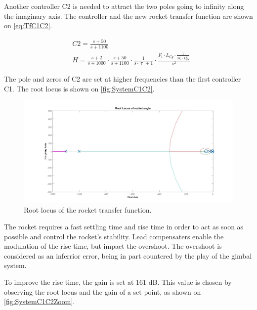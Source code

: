 Another controller C2 is needed to attract the two poles going to infinity along the imaginary axis. The controller and the new rocket transfer function are shown on \autoref{eq:TfC1C2}.

\begin{subequations}
	\begin{flalign}
		& C2 = \frac{s + 50}{s + 1100}	\\
		& H = \frac{s + 2}{s + 1000} \cdot \frac{s + 50}{s + 1100} \cdot \frac{1}{s \cdot \uptau + 1} \cdot \frac{F_t \cdot L_{Cg} \cdot \frac{1}{M_r \cdot L_{Es}^2}}{s^2}
		\label{eq:TfC1C2}
	\end{flalign}
\end{subequations}

The pole and zeros of C2 are set at higher frequencies than the first controller C1. The root locus is shown on \autoref{fig:SystemC1C2}.

\begin{figure}[htbp]
	\centering
	
		\includegraphics[width=\textwidth]{figures/Rocket/design/tf_with_controller_1_vf2}
		\caption{Root locus of the rocket transfer function.}
		\label{fig:SystemC1C2}
		
\end{figure}

The rocket requires a fast settling time and rise time in order to act as soon as possible and control the rocket's stability. Lead compensaters enable the modulation of the rise time, but impact the overshoot. The overshoot is considered as an inferrior error, being in part countered by the play of the gimbal system. 

To improve the rise time, the gain is set at $161$ \si{\dB}. This value is chosen by observing the root locus and the gain of a set point, as shown on \autoref{fig:SystemC1C2Zoom}. 

